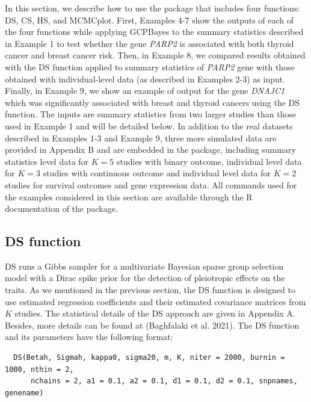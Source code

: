 In this section, we describe how to use the  package that includes four functions: DS, CS, HS, and MCMCplot.
First, Examples 4-7 show the outputs of each of the four functions while applying GCPBayes to the summary statistics described in Example 1 to test whether the gene \emph{PARP2} is associated with both thyroid cancer and breast cancer risk. Then, in Example 8, we compared results obtained with the DS function applied to summary statistics of \emph{PARP2} gene with those obtained with individual-level data (as described in Examples 2-3) as input. Finally, in Example 9, we show an example of output for the gene \emph{DNAJC1} which was significantly associated with breast and thyroid cancers using the DS function. The inputs are summary statistics from two larger studies than those used in Example 1 and will be detailed below.
In addition to the real datasets described in Examples 1-3 and Example 9, three more simulated data are provided in Appendix B and are embedded in the  package, including summary statistics level data for \(K=5\) studies with binary outcome,
individual level data for \(K=3\) studies with continuous outcome and individual level data for \(K=2\) studies for survival outcomes and gene expression data. All commands used for the examples considered in this section are available through the R documentation of the  package.

\hypertarget{ds-function}{%
\subsection{DS function}\label{ds-function}}

DS runs a Gibbs sampler for a multivariate Bayesian sparse group selection model with a Dirac spike prior for the detection of pleiotropic effects on the traits. As we mentioned in the previous section, the DS function is designed to use estimated regression coefficients and their estimated covariance matrices from \(K\) studies. The statistical details of the DS approach are given in Appendix A. Besides, more details can be found at (Baghfalaki et al. 2021).
The DS function and its parameters have the following format:

\begin{verbatim}
  DS(Betah, Sigmah, kappa0, sigma20, m, K, niter = 2000, burnin = 1000, nthin = 2, 
      nchains = 2, a1 = 0.1, a2 = 0.1, d1 = 0.1, d2 = 0.1, snpnames, genename)
\end{verbatim}

